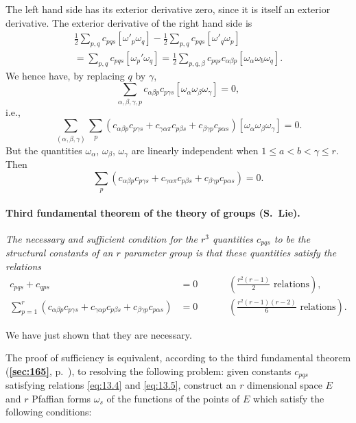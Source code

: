 \documentclass[leqno,11pt]{book}
\numberwithin{equation}{chapter}
\theoremstyle{shape1}
\theoremstyle{shapesmall}
\newcommand{\fsref}[1]{{\rm\textsection\textbf{\ref{sec:#1}}}}
\newcommand{\somespace}{\vspace{9pt}}
\begin{document}
The left hand side has its exterior derivative zero, since it is itself an exterior derivative. The exterior derivative of the right hand side is
\[
\begin{multlined}
  \frac{1}{2}\sum_{p,q}c_{pqs}[\omega'_{p}\omega_{q}]-\frac{1}{2}\sum_{p,q}c_{pqs}[\omega'_{q}\omega_{p}]\\
  =\sum_{p,q}c_{pqs}[\omega_{p}'\omega_{q}]=\frac{1}{2}\sum_{p,q,\beta}c_{pqs}c_{\alpha\beta p}[\omega_{\alpha}\omega_{b}\omega_{q}].
\end{multlined}
\]
We hence have, by replacing $q$ by $\gamma$,
\[
\sum_{\alpha,\beta,\gamma,p}c_{\alpha\beta p}c_{p\gamma s}[\omega_{\alpha}\omega_{\beta}\omega_{\gamma}]=0,
\]
i.e.,
\[
\sum_{(\alpha,\beta,\gamma)}\sum_{p}(c_{\alpha\beta p}c_{p\gamma s}+c_{\gamma\alpha\pi}c_{p\beta s}+c_{\beta\gamma p}c_{p\alpha s})[\omega_{\alpha}\omega_{\beta}\omega_{\gamma}]=0.
\]
But the quantities $\omega_{\alpha}$, $\omega_{\beta}$, $\omega_{\gamma}$ are linearly independent when $1\le a<b<\gamma\le r$. Then
\[
\sum_{p}(c_{\alpha\beta p}c_{p\gamma s}+c_{\gamma\alpha\pi}c_{p\beta s}+c_{\beta\gamma p}c_{p\alpha s})=0.
\]

\paragraph{Third fundamental theorem of the theory of groups (S.~Lie).}
\label{sec:199}
\emph{The necessary and sufficient condition for the $r^{3}$ quantities $c_{pqs}$ to be the structural constants of an $r$ parameter group is that these quantities satisfy the relations}
\begin{align}
  \label{eq:13.4}
  c_{pqs}+c_{qps}&=0&&&&\left(\frac{r^{2}(r-1)}{2}\text{ relations}\right),\\
  \label{eq:13.5}
  \sum_{p=1}^{r}(c_{\alpha\beta p}c_{p\gamma s}+c_{\gamma\alpha p}c_{p\beta s}+c_{\beta\gamma p}c_{p\alpha s})&=0&&&&\left(\frac{r^{2}(r-1)(r-2)}{6}\text{ relations}\right).  
\end{align}

\somespace

We have just shown that they are necessary.

The proof of sufficiency is equivalent, according to the third fundamental theorem (\fsref{165}, p.~\pageref{sec:165}), to resolving the following problem: given constants $c_{pqs}$ satisfying relations \eqref{eq:13.4} and \eqref{eq:13.5}, construct an $r$ dimensional space $E$ and $r$ Pfaffian forms $\omega_{s}$ of the functions of the points of $E$ which satisfy the following conditions:
\end{document}
